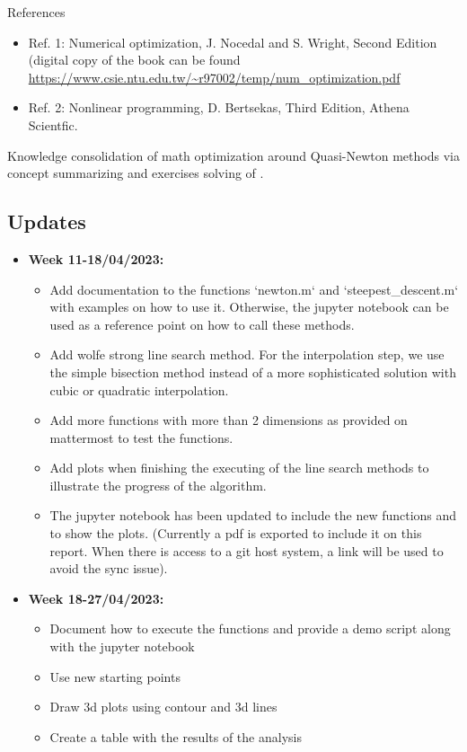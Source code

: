 \documentclass[a4paper,11pt]{article}
\numberwithin{equation}{section} %
\begin{document}
References
\begin{itemize}
 \item Ref. 1: Numerical optimization, J. Nocedal and S. Wright, Second Edition (digital copy of the book can be found \url{https://www.csie.ntu.edu.tw/~r97002/temp/num_optimization.pdf}
\item Ref. 2: Nonlinear programming, D. Bertsekas, Third Edition, Athena Scientfic.
\end{itemize}

Knowledge consolidation of math optimization around Quasi-Newton methods via concept summarizing and exercises solving of \cite{nocedal1999numerical, bertsekas1997nonlinear}.

\subsection{Updates}
\begin{itemize}
    \item \textbf{Week 11-18/04/2023:} 
    \begin{itemize}
        \item Add documentation to the functions `newton.m` and `steepest\_descent.m` with examples on how to use it. Otherwise, the jupyter notebook can be used as a reference point on how to call these methods.
        \item Add wolfe strong line search method. For the interpolation step, we use the simple bisection method instead of a more sophisticated solution with cubic or quadratic interpolation.
        \item Add more functions with more than 2 dimensions as provided on mattermost to test the functions.
        \item Add plots when finishing the executing of the line search methods to illustrate the progress of the algorithm.
        \item The jupyter notebook has been updated to include the new functions and to show the plots. (Currently a pdf is exported to include it on this report. When there is access to a git host system, a link will be used to avoid the sync issue).
    \end{itemize}
    \item \textbf{Week 18-27/04/2023:}
    \begin{itemize}
        \item Document how to execute the functions and provide a demo script along with the jupyter notebook
        \item Use new starting points
        \item Draw 3d plots using contour and 3d lines
        \item Create a table with the results of the analysis
    \end{itemize}
\end{itemize}
 
\end{document}
